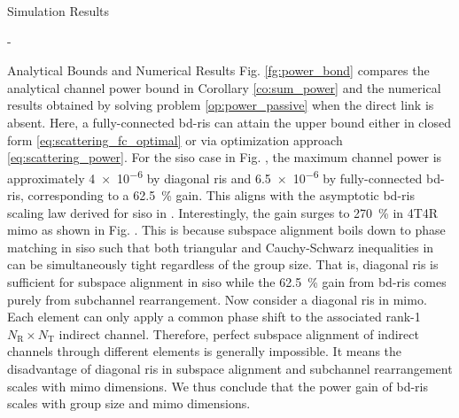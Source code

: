 \begin{section}{Simulation Results}
\begin{subsection}{-}
\begin{subsubsection}{Analytical Bounds and Numerical Results}
			Fig. \ref{fg:power_bond} compares the analytical channel power bound in Corollary \ref{co:sum_power} and the numerical results obtained by solving problem \eqref{op:power_passive} when the direct link is absent.
			Here, a fully-connected \gls{bd}-\gls{ris} can attain the upper bound either in closed form \eqref{eq:scattering_fc_optimal} or via optimization approach \eqref{eq:scattering_power}.
			For the \gls{siso} case in Fig. , the maximum channel power is approximately \num{4e-6} by diagonal \gls{ris} and \num{6.5e-6} by fully-connected \gls{bd}-\gls{ris}, corresponding to a \qty{62.5}{\percent} gain.
			This aligns with the asymptotic \gls{bd}-\gls{ris} scaling law derived for \gls{siso} in \cite{Shen2020a}.
			Interestingly, the gain surges to \qty{270}{\percent} in 4T4R \gls{mimo} as shown in Fig. .
			This is because subspace alignment boils down to phase matching in \gls{siso} such that both triangular and Cauchy-Schwarz inequalities in \cite[(50)]{Shen2020a} can be simultaneously tight regardless of the group size.
			That is, diagonal \gls{ris} is sufficient for subspace alignment in \gls{siso} while the \qty{62.5}{\percent} gain from \gls{bd}-\gls{ris} comes purely from subchannel rearrangement.
			Now consider a diagonal \gls{ris} in \gls{mimo}.
			Each element can only apply a common phase shift to the associated rank-1 $N_\mathrm{R} \times N_\mathrm{T}$ indirect channel.
			Therefore, perfect subspace alignment of indirect channels through different elements is generally impossible.
			It means the disadvantage of diagonal \gls{ris} in subspace alignment and subchannel rearrangement scales with \gls{mimo} dimensions.
			We thus conclude that the power gain of \gls{bd}-\gls{ris} scales with group size and \gls{mimo} dimensions.
		\end{subsubsection}



\end{subsection}
\end{section}
